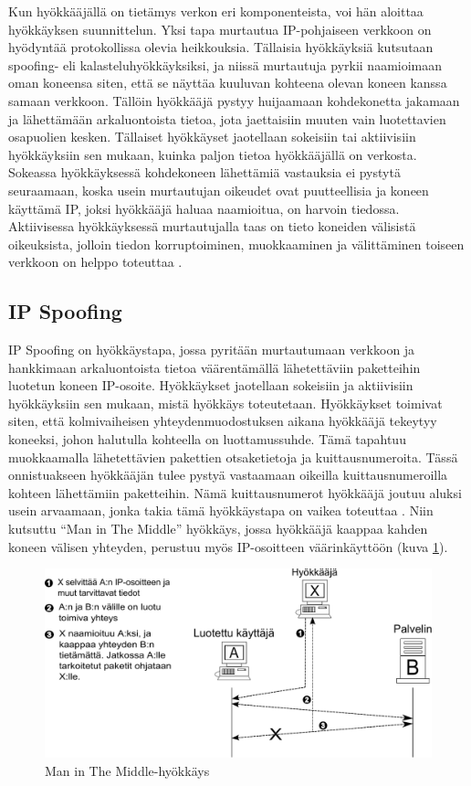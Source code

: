 Kun hyökkääjällä on tietämys verkon eri komponenteista, voi hän aloittaa
hyökkäyksen suunnittelun. Yksi tapa murtautua IP-pohjaiseen verkkoon
on hyödyntää protokollissa olevia heikkouksia. Tällaisia hyökkäyksiä kutsutaan
spoofing- eli kalasteluhyökkäyksiksi, ja niissä murtautuja pyrkii naamioimaan oman koneensa
siten, että se näyttäa kuuluvan kohteena olevan koneen kanssa samaan verkkoon.
Tällöin hyökkääjä pystyy huijaamaan kohdekonetta jakamaan ja lähettämään
arkaluontoista tietoa, jota jaettaisiin muuten vain luotettavien osapuolien kesken.
Tällaiset hyökkäyset jaotellaan sokeisiin tai aktiivisiin hyökkäyksiin sen mukaan, 
kuinka paljon tietoa hyökkääjällä on verkosta. Sokeassa hyökkäyksessä kohdekoneen
lähettämiä vastauksia ei pystytä seuraamaan, koska usein murtautujan oikeudet ovat puutteellisia
ja koneen käyttämä IP, joksi hyökkääjä haluaa naamioitua, on harvoin tiedossa.
Aktiivisessa hyökkäyksessä murtautujalla taas on tieto koneiden välisistä oikeuksista,
jolloin tiedon korruptoiminen, muokkaaminen ja välittäminen toiseen verkkoon
on helppo toteuttaa \cite{WEBS}.

\subsection{IP Spoofing}

IP Spoofing on hyökkäystapa, jossa pyritään murtautumaan verkkoon ja hankkimaan
arkaluontoista tietoa väärentämällä lähetettäviin paketteihin luotetun koneen
IP-osoite. Hyökkäykset jaotellaan sokeisiin ja aktiivisiin hyökkäyksiin sen mukaan,
mistä hyökkäys toteutetaan. Hyökkäykset toimivat siten, että kolmivaiheisen yhteydenmuodostuksen aikana
hyökkääjä tekeytyy koneeksi, johon halutulla kohteella on luottamussuhde. Tämä tapahtuu
muokkaamalla lähetettävien pakettien otsaketietoja ja kuittausnumeroita. Tässä onnistuakseen
hyökkääjän tulee pystyä vastaamaan oikeilla kuittausnumeroilla kohteen lähettämiin
paketteihin. Nämä kuittausnumerot hyökkääjä joutuu aluksi usein arvaamaan, jonka takia tämä
hyökkäystapa on vaikea toteuttaa \cite{WEBS}. Niin kutsuttu ``Man in The Middle'' hyökkäys, jossa hyökkääjä 
kaappaa kahden koneen välisen yhteyden, perustuu myös IP-osoitteen väärinkäyttöön (kuva \ref{Man}).

\begin{figure}[ht]
\centering
\includegraphics[width=13cm]{pics/MiTM.pdf}
\caption{Man in The Middle-hyökkäys}
\label{Man}
\end{figure}

